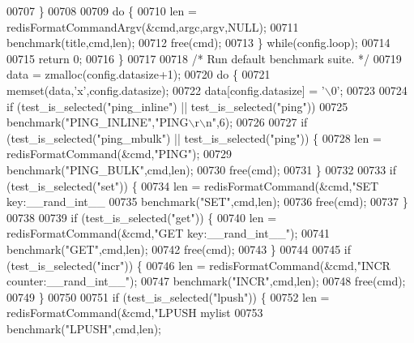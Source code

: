 \begin{DoxyCode}
{{{{{{{{{{{{{{{{{{{{{00707         \}
00708 
00709         \textcolor{keywordflow}{do} \{
00710             len = redisFormatCommandArgv(&cmd,argc,argv,NULL);
00711             benchmark(title,cmd,len);
00712             free(cmd);
00713         \} \textcolor{keywordflow}{while}(config.loop);
00714 
00715         \textcolor{keywordflow}{return} 0;
00716     \}
00717 
00718     \textcolor{comment}{/* Run default benchmark suite. */}
00719     data = zmalloc(config.datasize+1);
00720     \textcolor{keywordflow}{do} \{
00721         memset(data,\textcolor{stringliteral}{'x'},config.datasize);
00722         data[config.datasize] = \textcolor{stringliteral}{'\(\backslash\)0'};
00723 
00724         \textcolor{keywordflow}{if} (test\_is\_selected(\textcolor{stringliteral}{"ping\_inline"}) || test\_is\_selected(\textcolor{stringliteral}{"ping"}))
00725             benchmark(\textcolor{stringliteral}{"PING\_INLINE"},\textcolor{stringliteral}{"PING\(\backslash\)r\(\backslash\)n"},6);
00726 
00727         \textcolor{keywordflow}{if} (test\_is\_selected(\textcolor{stringliteral}{"ping\_mbulk"}) || test\_is\_selected(\textcolor{stringliteral}{"ping"})) \{
00728             len = redisFormatCommand(&cmd,\textcolor{stringliteral}{"PING"});
00729             benchmark(\textcolor{stringliteral}{"PING\_BULK"},cmd,len);
00730             free(cmd);
00731         \}
00732 
00733         \textcolor{keywordflow}{if} (test\_is\_selected(\textcolor{stringliteral}{"set"})) \{
00734             len = redisFormatCommand(&cmd,\textcolor{stringliteral}{"SET key:\_\_rand\_int\_\_ %
00735             benchmark(\textcolor{stringliteral}{"SET"},cmd,len);
00736             free(cmd);
00737         \}
00738 
00739         \textcolor{keywordflow}{if} (test\_is\_selected(\textcolor{stringliteral}{"get"})) \{
00740             len = redisFormatCommand(&cmd,\textcolor{stringliteral}{"GET key:\_\_rand\_int\_\_"});
00741             benchmark(\textcolor{stringliteral}{"GET"},cmd,len);
00742             free(cmd);
00743         \}
00744 
00745         \textcolor{keywordflow}{if} (test\_is\_selected(\textcolor{stringliteral}{"incr"})) \{
00746             len = redisFormatCommand(&cmd,\textcolor{stringliteral}{"INCR counter:\_\_rand\_int\_\_"});
00747             benchmark(\textcolor{stringliteral}{"INCR"},cmd,len);
00748             free(cmd);
00749         \}
00750 
00751         \textcolor{keywordflow}{if} (test\_is\_selected(\textcolor{stringliteral}{"lpush"})) \{
00752             len = redisFormatCommand(&cmd,\textcolor{stringliteral}{"LPUSH mylist %
00753             benchmark(\textcolor{stringliteral}{"LPUSH"},cmd,len);
}}}}}}}}}}}}}}}}}}}}}}}
\end{DoxyCode}
